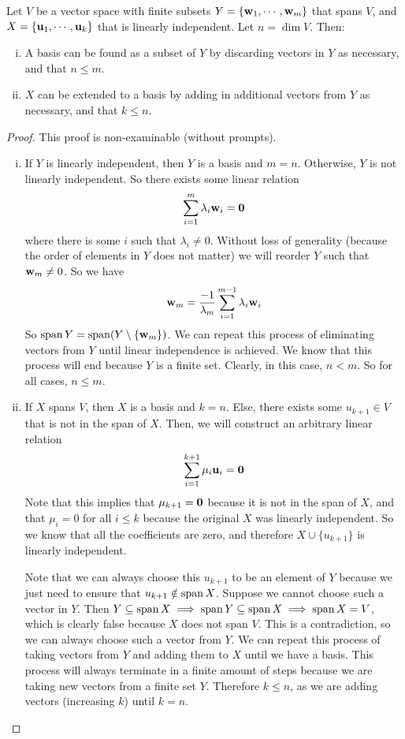\documentclass{article}
\begin{document}
\begin{proposition}
    Let $V$ be a vector space with finite subsets $Y = \{ \vb w_1, \cdots, \vb w_m \}$ that spans $V$, and $X = \{ \vb u_1, \cdots, \vb u_k \}$ that is linearly independent. Let $n = \dim V$. Then:
    \begin{enumerate}[(i)]
        \item A basis can be found as a subset of $Y$ by discarding vectors in $Y$ as necessary, and that $n \leq m$.
        \item $X$ can be extended to a basis by adding in additional vectors from $Y$ as necessary, and that $k \leq n$.
    \end{enumerate}
\end{proposition}
\begin{proof}
    This proof is non-examinable (without prompts).
    \begin{enumerate}[(i)]
        \item If $Y$ is linearly independent, then $Y$ is a basis and $m = n$. Otherwise, $Y$ is not linearly independent. So there exists some linear relation
              \[ \sum_{i=1}^{m} \lambda_i \vb w_i = \vb 0 \]
              where there is some $i$ such that $\lambda_i \neq 0$. Without loss of generality (because the order of elements in $Y$ does not matter) we will reorder $Y$ such that $\vb w_m \neq 0$. So we have
              \[ \vb w_m = \frac{-1}{\lambda_m} \sum_{i=1}^{m-1} \lambda_i \vb w_i \]
              So $\operatorname{span} Y = \operatorname{span} (Y \setminus \{ \vb w_m \})$. We can repeat this process of eliminating vectors from $Y$ until linear independence is achieved. We know that this process will end because $Y$ is a finite set. Clearly, in this case, $n < m$. So for all cases, $n \leq m$.

        \item If $X$ spans $V$, then $X$ is a basis and $k=n$. Else, there exists some $u_{k+1} \in V$ that is not in the span of $X$. Then, we will construct an arbitrary linear relation
              \[ \sum_{i=1}^{k+1} \mu_i \vb u_i = \vb 0 \]
              Note that this implies that $\mu_{k+1} = \vb 0$ because it is not in the span of $X$, and that $\mu_i = 0$ for all $i \leq k$ because the original $X$ was linearly independent. So we know that all the coefficients are zero, and therefore $X \cup \{ u_{k+1} \}$ is linearly independent.

              Note that we can always choose this $u_{k+1}$ to be an element of $Y$ because we just need to ensure that $u_{k+1} \notin \operatorname{span} X$. Suppose we cannot choose such a vector in $Y$. Then $Y \subseteq \operatorname{span} X \implies \operatorname{span} Y \subseteq \operatorname{span} X \implies \operatorname{span} X = V$, which is clearly false because $X$ does not span $V$. This is a contradiction, so we can always choose such a vector from $Y$. We can repeat this process of taking vectors from $Y$ and adding them to $X$ until we have a basis. This process will always terminate in a finite amount of steps because we are taking new vectors from a finite set $Y$. Therefore $k \leq n$, as we are adding vectors (increasing $k$) until $k=n$.
    \end{enumerate}
\end{proof}
\end{document}
